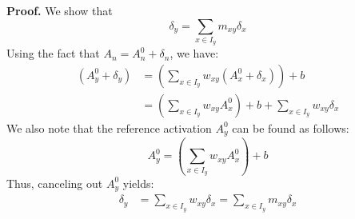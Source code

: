 \documentclass{article}
\begin{document}
{\bf Proof.} We show that
\begin{equation}
\delta_y = \sum_{x \in I_y} m_{xy} \delta_x 
\end{equation}
Using the fact that $A_n = A_n^0 + \delta_n$, we have:
\begin{equation}
\begin{aligned}
(A_y^0 + \delta_y) &= \left(\sum_{x \in I_y} w_{xy} (A_x^0 + \delta_x) \right) + b \\
                              &= \left(\sum_{x \in I_y} w_{xy} A_x^0 \right) + b + \sum_{x \in I_y} w_{xy} \delta_x
\end{aligned}
\end{equation} 
We also note that the reference activation $A_y^0$ can be found as follows:
\begin{equation}
A_y^0 = \left(\sum_{x \in I_y} w_{xy} A_x^0 \right) + b
\end{equation}
Thus, canceling out $A_y^0$ yields:
\begin{equation}
\begin{aligned}
\delta_y &= \sum_{x \in I_y} w_{xy} \delta_x = \sum_{x \in I_y} m_{xy} \delta_x
\end{aligned}
\end{equation} 


\end{document}
